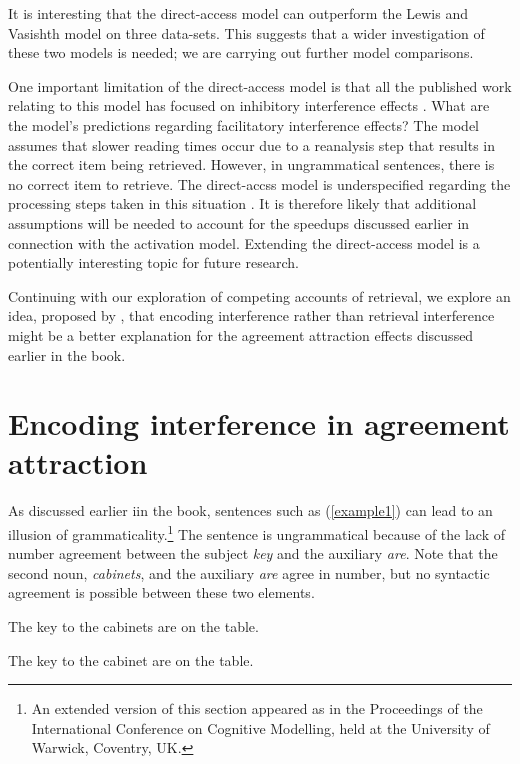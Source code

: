 \documentclass{cambridge7A}\usepackage[]{graphicx}\usepackage[]{color}
\begin{document}
It is interesting that the direct-access model can outperform the Lewis and Vasishth model on three data-sets. This suggests that a wider investigation of these two models is needed; we are carrying out further model comparisons.

One important limitation of the direct-access model is that all the published work relating to this model has focused on inhibitory interference effects \citep{VasishthEtAlTiCS2019}. What are the model's predictions regarding facilitatory interference effects? The model assumes that slower reading times occur due to a reanalysis step that results in the correct item being retrieved. However, in ungrammatical sentences, there is no correct item to retrieve. The direct-accss model is underspecified regarding the processing steps taken in this situation \citep{NicenboimRetrieval2018}. It is therefore likely that additional assumptions will be needed to account for the speedups discussed earlier in connection with the activation model. Extending the direct-access model is a potentially interesting topic for future research.


Continuing with our exploration of  competing accounts of retrieval, we explore an idea, proposed by \cite{VillataFranck}, that encoding interference rather  than retrieval interference might be a better explanation for the agreement attraction effects discussed earlier in the book.

\section{Encoding interference in agreement attraction} \label{encint}

As discussed earlier iin the book, sentences such as (\ref{example1}) can lead to an illusion of grammaticality.\footnote{An  extended version of this section appeared as \cite{VasishthEtAlICCM2017} in the Proceedings of the International Conference on Cognitive Modelling, held at the University of Warwick, Coventry, UK.}
The sentence is
ungrammatical because of the lack of number agreement between
the subject \textit{key} and the auxiliary \textit{are}.
Note that the second noun, \textit{cabinets}, and the auxiliary \textit{are} agree in number, but no syntactic agreement is possible between these two elements.

\begin{exe} 
\ex
\begin{xlist}
\item \label{example1}
The key to the cabinets are on the table.
\item \label{example2}
The key to the cabinet are on the table.
\end{xlist}
\end{exe}
\end{document}
